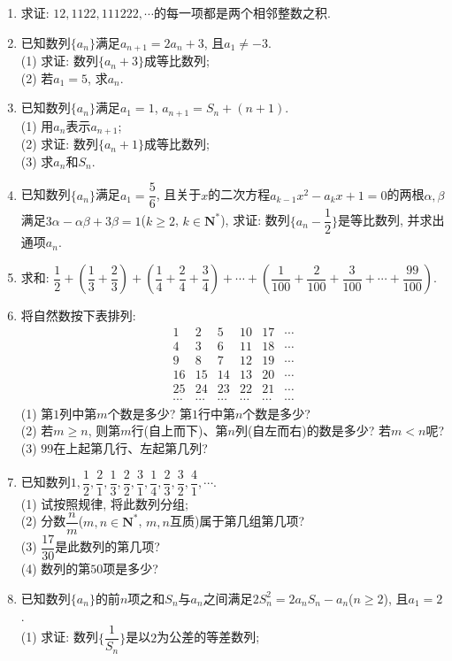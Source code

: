 \documentclass[10pt,a4paper]{article}
\begin{document}
\begin{enumerate}[1.]
\item 求证: $12, 1122, 111222, \cdots$的每一项都是两个相邻整数之积.
\item 已知数列$\{a_n\}$满足$a_{n+1}=2a_n+3$, 且$a_1\ne -3$.\\
(1) 求证: 数列$\{a_n+3\}$成等比数列;\\
(2) 若$a_1=5$, 求$a_n$.
\item 已知数列$\{a_n\}$满足$a_1=1$, $a_{n+1}=S_n+(n+1)$.\\
(1) 用$a_n$表示$a_{n+1}$;\\
(2) 求证: 数列$\{a_n+1\}$成等比数列;\\
(3) 求$a_n$和$S_n$.
\item 已知数列$\{a_n\}$满足$a_1=\dfrac 56$, 且关于$x$的二次方程$a_{k-1}x^2-a_kx+1=0$的两根$\alpha ,\beta$满足$3\alpha -\alpha \beta +3\beta =1$($k\ge 2$, $k\in \mathbf{N}^*$), 求证: 数列$\{a_n-\dfrac 12\}$是等比数列, 并求出通项$a_n$.
\item 求和: $\dfrac 12+(\dfrac 13+\dfrac 23)+(\dfrac 14+\dfrac 24+\dfrac 34)+\cdots +(\dfrac 1{100}+\dfrac 2{100}+\dfrac 3{100}+\cdots +\dfrac{99}{100})$.
\item 将自然数按下表排列:
\[\begin{array}{cccccc}
1&2&5&10&17&\cdots \\
4&3&6&11&18&\cdots \\
9&8&7&12&19&\cdots \\
16&15&14&13&20&\cdots \\
25&24&23&22&21&\cdots \\
\cdots&\cdots&\cdots&\cdots&\cdots&\cdots	
\end{array}\]		
(1) 第$1$列中第$m$个数是多少? 第$1$行中第$n$个数是多少?\\
(2) 若$m\ge n$, 则第$m$行(自上而下)、第$n$列(自左而右)的数是多少? 若$m<n$呢?\\
(3) $99$在上起第几行、左起第几列?
\item 已知数列$1,\dfrac 12,\dfrac 21,\dfrac 13,\dfrac 22,\dfrac 31,\dfrac 14,\dfrac 23,\dfrac 32,\dfrac 41,\cdots$.\\
(1) 试按照规律, 将此数列分组;\\
(2) 分数$\dfrac nm$($m,n\in \mathbf{N}^*$, $m,n$互质)属于第几组第几项?\\
(3) $\dfrac{17}{30}$是此数列的第几项?\\
(4) 数列的第$50$项是多少?
\item 已知数列$\{a_n\}$的前$n$项之和$S_n$与$a_n$之间满足$2S_n^2=2a_nS_n-a_n$($n\ge 2$), 且$a_1=2$.\\
(1) 求证: 数列$\{\dfrac 1{S_n}\}$是以$2$为公差的等差数列;\\

\end{enumerate}
\end{document}
